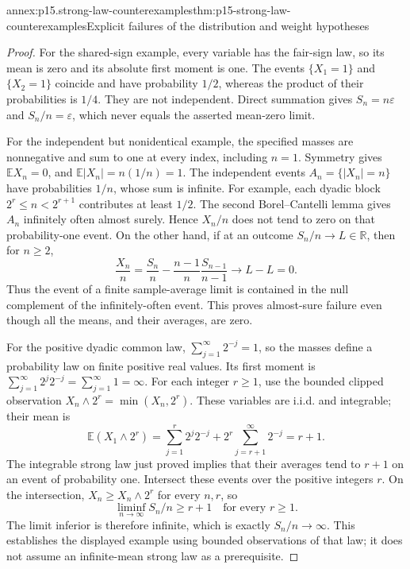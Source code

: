 \begin{annexitem}{annex:p15.strong-law-counterexamples}{thm:p15-strong-law-counterexamples}{Explicit failures of the distribution and weight hypotheses}
\begin{proof}
For the shared-sign example, every variable has the fair-sign law,
so its mean is zero and its absolute first moment is one. The events
\(\{X_1=1\}\) and \(\{X_2=1\}\) coincide and have probability
\(1/2\), whereas the product of their probabilities is \(1/4\).
They are not independent. Direct summation gives
\(S_n=n\varepsilon\) and \(S_n/n=\varepsilon\), which never
equals the asserted mean-zero limit.

For the independent but nonidentical example, the specified masses
are nonnegative and sum to one at every index, including \(n=1\).
Symmetry gives \(\mathbb EX_n=0\), and
\(\mathbb E|X_n|=n(1/n)=1\). The independent events
\(A_n=\{|X_n|=n\}\) have probabilities \(1/n\), whose sum
is infinite. For example, each dyadic block
\(2^r\leq n<2^{r+1}\) contributes at least \(1/2\).
The second Borel--Cantelli lemma gives \(A_n\) infinitely often
almost surely. Hence \(X_n/n\) does not tend to zero on that
probability-one event.
On the other hand, if at an outcome \(S_n/n\to L\in\mathbb R\),
then for \(n\geq2\),
\[
 \frac{X_n}{n}
   =\frac{S_n}{n}-\frac{n-1}{n}\frac{S_{n-1}}{n-1}
                           \longrightarrow L-L=0.
\]
Thus the event of a finite sample-average limit is contained in the
null complement of the infinitely-often event. This proves almost-sure
failure even though all the means, and their averages, are zero.

For the positive dyadic common law,
\(\sum_{j=1}^\infty2^{-j}=1\), so the masses define a probability
law on finite positive real values. Its first moment is
\(\sum_{j=1}^\infty2^j2^{-j}=\sum_{j=1}^\infty1=\infty\).
For each integer \(r\geq1\), use the bounded clipped observation
\(X_n\wedge2^r=\min(X_n,2^r)\). These variables are i.i.d.
and integrable; their mean is
\[
 \mathbb E(X_1\wedge2^r)
  =\sum_{j=1}^r2^j2^{-j}
       +2^r\sum_{j=r+1}^\infty2^{-j}=r+1.
\]
The integrable strong law just proved implies that their averages
tend to \(r+1\) on an event of probability one. Intersect these
events over the positive integers \(r\). On the intersection,
\(X_n\geq X_n\wedge2^r\) for every \(n,r\), so
\[
 \liminf_{n\to\infty}S_n/n\geq r+1
                                  \quad\text{for every }r\geq1.
\]
The limit inferior is therefore infinite, which is exactly
\(S_n/n\to\infty\). This establishes the displayed example
using bounded observations of that law; it does not assume an
infinite-mean strong law as a prerequisite.


\end{proof}
\end{annexitem}
